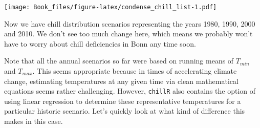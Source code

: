 \documentclass[
]{book}
\begin{document}
\texttt{[image: Book\_files/figure-latex/condense\_chill\_list-1.pdf]}

Now we have chill distribution scenarios representing the years 1980, 1990, 2000 and 2010. We don't see too much change here, which means we probably won't have to worry about chill deficiencies in Bonn any time soon.

Note that all the annual scenarios so far were based on running means of \(T_{min}\) and \(T_{max}\). This seems appropriate because in times of accelerating climate change, estimating temperatures at any given time via clean mathematical equations seems rather challenging. However, \texttt{chillR} also contains the option of using linear regression to determine these representative temperatures for a particular historic scenario. Let's quickly look at what kind of difference this makes in this case.
\end{document}
